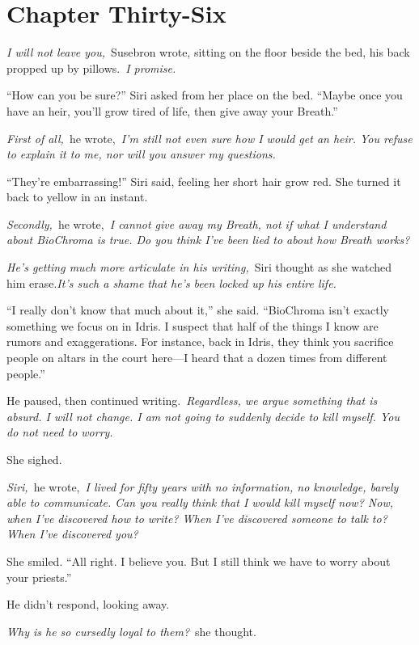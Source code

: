 \section{Chapter Thirty-Six}

\textit{I will not leave you,}~Susebron wrote, sitting on the floor beside the bed, his back propped up by pillows.~\textit{I promise.}

“How can you be sure?” Siri asked from her place on the bed. “Maybe once you have an heir, you’ll grow tired of life, then give away your Breath.”

\textit{First of all,}~he wrote,~\textit{I’m still not even sure how I would get an heir. You refuse to explain it to me, nor will you answer my questions.}

“They’re embarrassing!” Siri said, feeling her short hair grow red. She turned it back to yellow in an instant.

\textit{Secondly,}~he wrote,~\textit{I cannot give away my Breath, not if what I understand about BioChroma is true. Do you think I’ve been lied to about how Breath works?}

\textit{He’s getting much more articulate in his writing,}~Siri thought as she watched him erase.\textit{It’s such a shame that he’s been locked up his entire life.}

“I really don’t know that much about it,” she said. “BioChroma isn’t exactly something we focus on in Idris. I suspect that half of the things I know are rumors and exaggerations. For instance, back in Idris, they think you sacrifice people on altars in the court here—I heard that a dozen times from different people.”

He paused, then continued writing.~\textit{Regardless, we argue something that is absurd. I will not change. I am not going to suddenly decide to kill myself. You do not need to worry.}

She sighed.

\textit{Siri,}~he wrote,~\textit{I lived for fifty years with no information, no knowledge, barely able to communicate. Can you really think that I would kill myself now? Now, when I’ve discovered how to write? When I’ve discovered someone to talk to? When I’ve discovered you?}

She smiled. “All right. I believe you. But I still think we have to worry about your priests.”

He didn’t respond, looking away.

\textit{Why is he so cursedly loyal to them?}~she thought.

